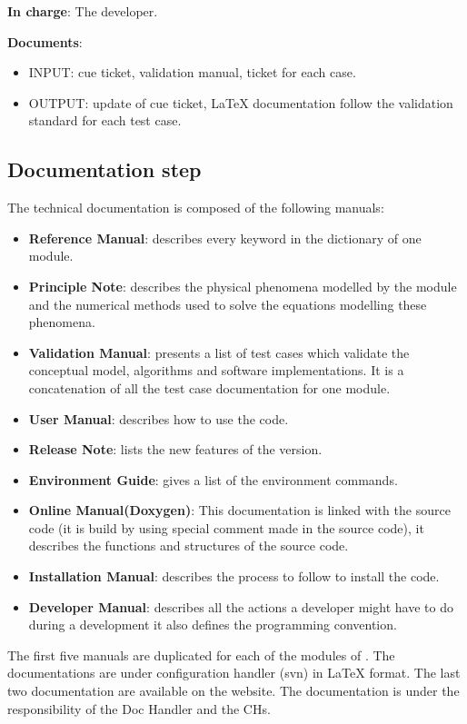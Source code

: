 \textbf{In charge}: The developer.

\textbf{Documents}:
\begin{itemize}
\item INPUT: cue ticket, validation manual, ticket for each case.
\item OUTPUT: update of cue ticket, \LaTeX\xspace documentation follow the validation
standard for each test case.
\end{itemize}

\subsection{Documentation step}

The \telemacsystem technical documentation is composed of the following manuals:
\begin{itemize}
\item \textbf{Reference Manual}: describes every keyword in the dictionary of
one module.
\item \textbf{Principle Note}: describes the physical phenomena modelled by the
module and the numerical methods used to solve the equations modelling these
phenomena.
\item \textbf{Validation Manual}: presents a list of test cases which validate
the conceptual model, algorithms and software implementations. It is a
concatenation of all the test case documentation for one module.
\item \textbf{User Manual}: describes how to use the code.
\item \textbf{Release Note}: lists the new features of the version.
\item \textbf{Environment Guide}: gives a list of the environment commands.
\item \textbf{Online Manual(Doxygen)}: This documentation is linked with the
source code (it is build by using special comment made in the source code), it
describes the functions and structures of the source code.
\item \textbf{Installation Manual}: describes the process to follow to install
the \telemacsystem code.
\item \textbf{Developer Manual}: describes all the actions a developer might have
to do during a development it also defines the programming convention.
\end{itemize}

The first five manuals are duplicated for each of the modules of \telemacsystem.  The
documentations are under configuration handler (svn) in \LaTeX\xspace format.  The last
two documentation are available on the \telemacsystem website.  The documentation is
under the responsibility of the Doc Handler and the CHs.

